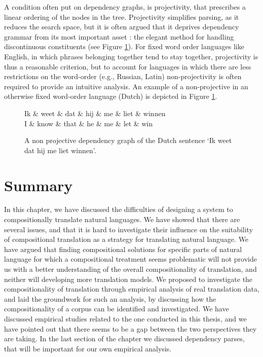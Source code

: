 A condition often put on dependency graphs, is projectivity, that prescribes a linear ordering of the nodes in the tree. Projectivity simplifies parsing, as it reduces the search space, but it is often argued that it deprives dependency grammar from its most important asset \citep{covington1990dependency,debusmann2000introduction}: the elegant method for handling discontinuous constituents (see Figure \ref{fig:npdeptree}). For fixed word order languages like English, in which phrases belonging together tend to stay together, projectivity is thus a reasonable criterion, but to account for languages in which there are less restrictions on the word-order (e.g., Russian, Latin) non-projectivity is often required to provide an intuitive analysis. An example of a non-projective in an otherwise fixed word-order language (Dutch) is depicted in Figure \ref{fig:npdeptree}.

\begin{figure}[!ht]
\centering
\begin{dependency}[theme=simple]%
\begin{deptext}[column sep=.5cm, row sep=.1ex]
Ik \& weet \& dat \& hij \& me \& liet \& winnen\\
\tiny{I} \& \tiny{know} \& \tiny{that} \& \tiny{he} \& \tiny{me} \& \tiny{let} \& \tiny{win}\\
\end{deptext}
\end{dependency}
\caption{A non projective dependency graph of the Dutch sentence `Ik weet dat hij me liet winnen'.}\label{fig:npdeptree}
\end{figure}

\section{Summary}
\label{sec:summary}

In this chapter, we have discussed the difficulties of designing a system to compositionally translate natural languages. We have showed that there are several issues, and that it is hard to investigate their influence on the suitability of compositional translation as a strategy for translating natural language. We have argued that finding compositional solutions for specific parts of natural language for which a compositional treatment seems problematic will not provide us with a better understanding of the overall compositionality of translation, and neither will developing more translation models. We proposed to investigate the compositionality of translation through empirical analysis of real translation data, and laid the groundwork for such an analysis, by discussing how the compositionality of a corpus can be identified and investigated. We have discussed empirical studies related to the one conducted in this thesis, and we have pointed out that there seems to be a gap between the two perspectives they are taking. In the last section of the chapter we discussed dependency parses, that will be important for our own empirical analysis.